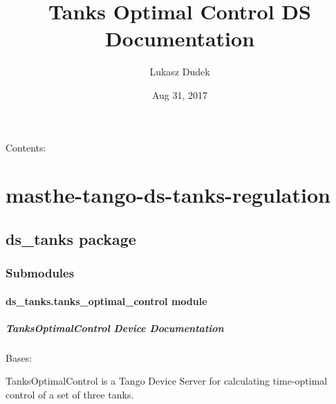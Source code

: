 \documentclass[letterpaper,10pt,english]{sphinxmanual}
\title{Tanks Optimal Control DS Documentation}
\date{Aug 31, 2017}
\author{Lukasz Dudek}
\begin{document}
\maketitle
\tableofcontents
{}\label{index::doc}


Contents:


\chapter{masthe-tango-ds-tanks-regulation}
\label{modules:masthe-tango-ds-tanks-regulation}\label{modules::doc}\label{modules:welcome-to-tanks-optimal-control-ds-s-documentation}

\section{ds\_tanks package}
\label{ds_tanks:ds-tanks-package}\label{ds_tanks::doc}

\subsection{Submodules}
\label{ds_tanks:submodules}

\subsubsection{ds\_tanks.tanks\_optimal\_control module}
\label{ds_tanks.tanks_optimal_control::doc}\label{ds_tanks.tanks_optimal_control:module-ds_tanks.tanks_optimal_control}\label{ds_tanks.tanks_optimal_control:ds-tanks-tanks-optimal-control-module}

\paragraph{TanksOptimalControl Device Documentation}
\label{ds_tanks.tanks_optimal_control:tanksoptimalcontrol-device-documentation}

\begin{fulllineitems}
\label{ds_tanks.tanks_optimal_control:ds_tanks.tanks_optimal_control.TanksOptimalControl}
Bases: 

TanksOptimalControl is a Tango Device Server for calculating time-optimal
control of a set of three tanks.

\end{fulllineitems}
\end{document}
